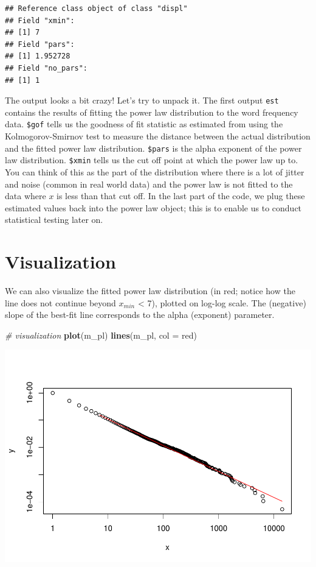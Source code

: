 \documentclass[
]{book}
\newenvironment{Shaded}{\begin{snugshade}}{\end{snugshade}}
\newcommand{\AttributeTok}[1]{\textcolor[rgb]{0.13,0.29,0.53}{#1}}
\newcommand{\CommentTok}[1]{\textcolor[rgb]{0.56,0.35,0.01}{\textit{#1}}}
\newcommand{\FunctionTok}[1]{\textcolor[rgb]{0.13,0.29,0.53}{\textbf{#1}}}
\newcommand{\NormalTok}[1]{#1}
\newcommand{\StringTok}[1]{\textcolor[rgb]{0.31,0.60,0.02}{#1}}
\begin{document}
\begin{verbatim}
## Reference class object of class "displ" 
## Field "xmin": 
## [1] 7
## Field "pars": 
## [1] 1.952728
## Field "no_pars": 
## [1] 1
\end{verbatim}

The output looks a bit crazy! Let's try to unpack it. The first output \texttt{est} contains the results of fitting the power law distribution to the word frequency data. \texttt{\$gof} tells us the goodness of fit statistic as estimated from using the Kolmogorov-Smirnov test to measure the distance between the actual distribution and the fitted power law distribution. \texttt{\$pars} is the alpha exponent of the power law distribution. \texttt{\$xmin} tells us the cut off point at which the power law up to. You can think of this as the part of the distribution where there is a lot of jitter and noise (common in real world data) and the power law is not fitted to the data where \(x\) is less than that cut off. In the last part of the code, we plug these estimated values back into the power law object; this is to enable us to conduct statistical testing later on.

\section{Visualization}\label{visualization}

We can also visualize the fitted power law distribution (in red; notice how the line does not continue beyond \(x_{min}\) \textless{} 7), plotted on log-log scale. The (negative) slope of the best-fit line corresponds to the alpha (exponent) parameter.

\begin{Shaded}
\begin{Highlighting}[]
\CommentTok{\# visualization }
\FunctionTok{plot}\NormalTok{(m\_pl)}
\FunctionTok{lines}\NormalTok{(m\_pl, }\AttributeTok{col =} \StringTok{\textquotesingle{}red\textquotesingle{}}\NormalTok{) }
\end{Highlighting}
\end{Shaded}

\includegraphics{bookdown-demo_files/figure-latex/unnamed-chunk-194-1.pdf}
\end{document}
